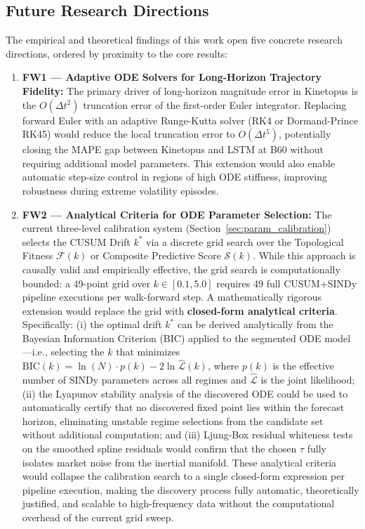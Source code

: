\documentclass[11pt,a4paper]{article}
\begin{document}
\subsection{Future Research Directions}

The empirical and theoretical findings of this work open five concrete research directions, ordered by proximity to the core results:
\begin{enumerate}[leftmargin=1.5em]
    \item \textbf{FW1 --- Adaptive ODE Solvers for Long-Horizon Trajectory Fidelity:} The primary driver of long-horizon magnitude error in Kinetopus is the $O(\Delta t^2)$ truncation error of the first-order Euler integrator. Replacing forward Euler with an adaptive Runge-Kutta solver (RK4 or Dormand-Prince RK45) would reduce the local truncation error to $O(\Delta t^5)$, potentially closing the MAPE gap between Kinetopus and LSTM at B60 without requiring additional model parameters. This extension would also enable automatic step-size control in regions of high ODE stiffness, improving robustness during extreme volatility episodes.
    \item \textbf{FW2 --- Analytical Criteria for ODE Parameter Selection:} The current three-level calibration system (Section~\ref{sec:param_calibration}) selects the CUSUM Drift $k^*$ via a discrete grid search over the Topological Fitness $\mathcal{F}(k)$ or Composite Predictive Score $\mathcal{S}(k)$. While this approach is causally valid and empirically effective, the grid search is computationally bounded: a 49-point grid over $k \in [0.1, 5.0]$ requires 49 full CUSUM+SINDy pipeline executions per walk-forward step. A mathematically rigorous extension would replace the grid with \textbf{closed-form analytical criteria}. Specifically: (i) the optimal drift $k^*$ can be derived analytically from the Bayesian Information Criterion (BIC) applied to the segmented ODE model---i.e., selecting the $k$ that minimizes $\mathrm{BIC}(k) = \ln(N) \cdot p(k) - 2\ln\hat{\mathcal{L}}(k)$, where $p(k)$ is the effective number of SINDy parameters across all regimes and $\hat{\mathcal{L}}$ is the joint likelihood; (ii) the Lyapunov stability analysis of the discovered ODE could be used to automatically certify that no discovered fixed point lies within the forecast horizon, eliminating unstable regime selections from the candidate set without additional computation; and (iii) Ljung-Box residual whiteness tests on the smoothed spline residuals would confirm that the chosen $\tau$ fully isolates market noise from the inertial manifold. These analytical criteria would collapse the calibration search to a single closed-form expression per pipeline execution, making the discovery process fully automatic, theoretically justified, and scalable to high-frequency data without the computational overhead of the current grid sweep.

\end{enumerate}
\end{document}
